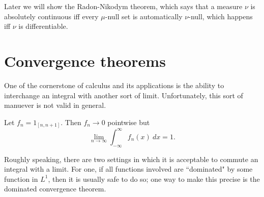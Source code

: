 \begin{subsec}
Later we will show the Radon-Nikodym theorem, which says that a measure $\nu$ is absolutely continuous iff every $\mu$-null set is automatically $\nu$-null, which happens iff $\nu$ is differentiable.
\end{subsec}


\section{Convergence theorems}
One of the cornerstone of calculus and its applications is the ability to interchange an integral with another sort of limit.
Unfortunately, this sort of manuever is not valid in general.

\begin{example}
Let $f_{n} = 1_{[n, n + 1]}$. Then $f_{n} \to 0$ pointwise but
\[\lim_{n \to \infty} \int_{-\infty}^{\infty} f_{n}(x) ~dx = 1.\]
\end{example}

\begin{subsec}
Roughly speaking, there are two settings in which it is acceptable to commute an integral with a limit.
For one, if all functions involved are ``dominated" by some function in $L^1$, then it is usually safe to do so; one way to make this precise is the dominated convergence theorem.
\end{subsec}

